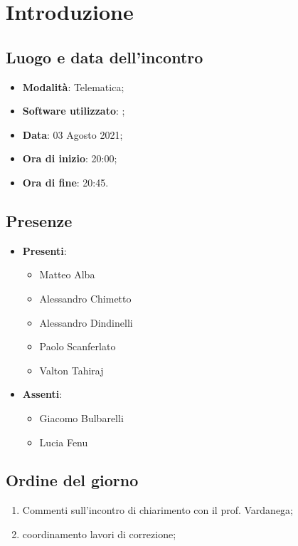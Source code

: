 \documentclass[]{article}
\begin{document}
	

	\newpage


		\section{Introduzione}
		\subsection{Luogo e data dell'incontro}
		\begin{itemize}
			\item \textbf{Modalità}: Telematica;
			\item \textbf{Software utilizzato}: ;
			\item \textbf{Data}: 03 Agosto 2021;
			\item \textbf{Ora di inizio}: 20:00;
			\item \textbf{Ora di fine}: 20:45.
		\end{itemize}

		\subsection{Presenze}
		\begin{itemize}
			\item \textbf{Presenti}:
			\begin{itemize}
				\item Matteo Alba
				\item Alessandro Chimetto
				\item Alessandro Dindinelli
				\item Paolo Scanferlato
				\item Valton Tahiraj
			\end{itemize}
			\item \textbf{Assenti}:
			\begin{itemize}
				\item Giacomo Bulbarelli
				\item Lucia Fenu
			\end{itemize}
		\end{itemize}


		\subsection{Ordine del giorno}
		\begin{enumerate}
			\item Commenti sull'incontro di chiarimento con il prof. Vardanega;
            \item coordinamento lavori di correzione;
		\end{enumerate}
\end{document}
